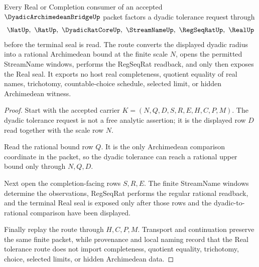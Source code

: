 \begin{theorem}
\label{thm:dyadic-archimedean-bridge-real-tolerance-route}
Every Real or Completion consumer of an accepted $\DyadicArchimedeanBridgeUp$ packet factors a dyadic tolerance request through
$$
\NatUp,\ \RatUp,\ \DyadicRatCoreUp,\ \StreamNameUp,\ \RegSeqRatUp,\ \RealUp
$$
before the terminal seal is read. The route converts the displayed dyadic radius into a rational Archimedean bound at the finite scale $N$, opens the permitted StreamName windows, performs the RegSeqRat readback, and only then exposes the Real seal. It exports no host real completeness, quotient equality of real names, trichotomy, countable-choice schedule, selected limit, or hidden Archimedean witness.
\end{theorem}
\begin{proof}
Start with the accepted carrier $K=(N,Q,D,S,R,E,H,C,P,M)$. The dyadic tolerance request is not a free analytic assertion; it is the displayed row $D$ read together with the scale row $N$.

Read the rational bound row $Q$. It is the only Archimedean comparison coordinate in the packet, so the dyadic tolerance can reach a rational upper bound only through $N,Q,D$.

Next open the completion-facing rows $S,R,E$. The finite StreamName windows determine the observations, RegSeqRat performs the regular rational readback, and the terminal Real seal is exposed only after those rows and the dyadic-to-rational comparison have been displayed.

Finally replay the route through $H,C,P,M$. Transport and continuation preserve the same finite packet, while provenance and local naming record that the Real tolerance route does not import completeness, quotient equality, trichotomy, choice, selected limits, or hidden Archimedean data.
\end{proof}




